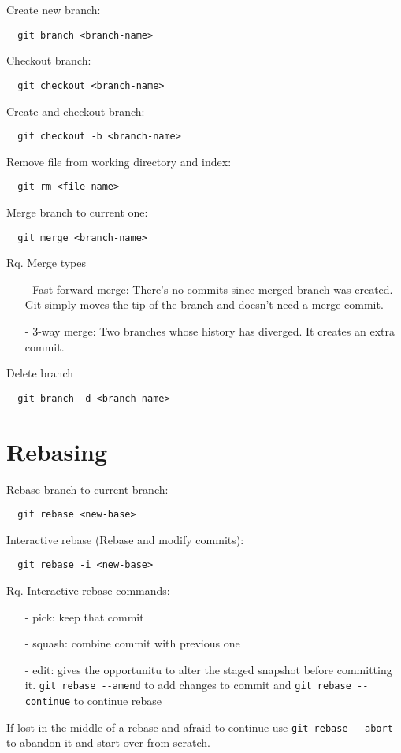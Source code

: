\documentclass[french]{article}
\begin{document}
Create new branch:
\begin{verbatim}
  git branch <branch-name>
\end{verbatim}

Checkout branch:
\begin{verbatim}
  git checkout <branch-name>
\end{verbatim}

Create and checkout branch:
\begin{verbatim}
  git checkout -b <branch-name>
\end{verbatim}

Remove file from working directory and index:
\begin{verbatim}
  git rm <file-name>
\end{verbatim}

Merge branch to current one:
\begin{verbatim}
  git merge <branch-name>
\end{verbatim}

Rq. Merge types
\begin{itemize}
  \item [-] Fast-forward merge: There's no commits since merged branch was created. Git simply moves the tip of the branch and doesn't need a merge commit.
  \item [-] 3-way merge: Two branches whose history has diverged. It creates an extra commit.
\end{itemize}$ $\\

Delete branch
\begin{verbatim}
  git branch -d <branch-name>
\end{verbatim}

\section{Rebasing}

Rebase branch to current branch:
\begin{verbatim}
  git rebase <new-base>
\end{verbatim}

Interactive rebase (Rebase and modify commits):
\begin{verbatim}
  git rebase -i <new-base>
\end{verbatim}

Rq. Interactive rebase commands:
\begin{itemize}
  \item [-] pick: keep that commit
  \item [-] squash: combine commit with previous one
  \item [-] edit: gives the opportunitu to alter the staged snapshot before committing it. \verb|git rebase --amend| to add changes to commit and \verb|git rebase --continue| to continue rebase
\end{itemize}
If lost in the middle of a rebase and afraid to continue use \verb|git rebase --abort| to abandon it and start over from scratch.
$ $\\
\end{document}
